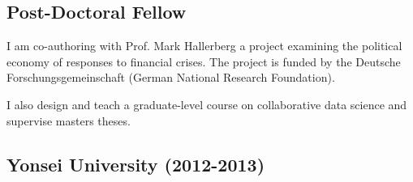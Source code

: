 \documentclass[a4paper]{article}
\begin{document}
\subsection*{Post-Doctoral Fellow}

I am co-authoring with Prof. Mark Hallerberg a project examining the political economy of responses to financial crises. The project is funded by the Deutsche Forschungsgemeinschaft (German National Research Foundation).\vspace{0.25cm}

\noindent I also design and teach a graduate-level course on collaborative data science and supervise masters theses.

\subsection*{Yonsei University (2012-2013)}
\end{document}
